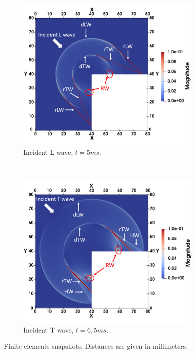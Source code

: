 \begin{figure}
\centering
    \begin{subfigure}[b]{0.44\textwidth}
        \includegraphics[width=\textwidth]{images/chapter3/Figure10a.pdf}
        \caption{Incident L wave, $t=5ms$.}
        \label{snapLL}
    \end{subfigure}  
    ~
     \begin{subfigure}[b]{0.44\textwidth}
        \includegraphics[width=\textwidth]{images/chapter3/Figure10b.pdf}
        \caption{Incident T wave, $t=6,5ms$. }
        \label{snapTL}
    \end{subfigure}
     \caption{Finite elements snapshots. Distances are given in millimeters. }
     \label{snap}
\end{figure}

